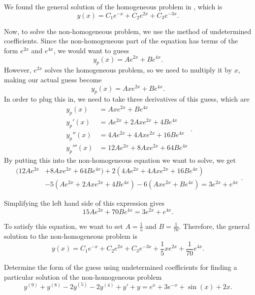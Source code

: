 \begin{exampleSol}
We found the general solution of the homogeneous problem in , which is 
\[ y(x) = C_1 e^{-x} + C_2 e^{2x}+ C_3e^{-3x}. \]

Now, to solve the non-homogeneous problem, we use the method of undetermined coefficients. Since the non-homogeneous part of the equation has terms of the form $e^{2x}$ and $e^{4x}$, we would want to guess 
\[ y_p(x) = Ae^{2x} + Be^{4x}.\] However, $e^{2x}$ solves the homogeneous problem, so we need to multiply it by $x$, making our actual guess become 
\[ y_p(x) = Axe^{2x} + Be^{4x}.\] In order to plug this in, we need to take three derivatives of this guess, which are
\[ 
\begin{split}
y_p(x) &= Axe^{2x} + Be^{4x} \\
y_p'(x) &= Ae^{2x} + 2Axe^{2x} + 4Be^{4x} \\
y_p''(x) &= 4Ae^{2x} + 4Axe^{2x} + 16Be^{4x} \\
y_p'''(x) &= 12Ae^{2x} + 8Axe^{2x} + 64Be^{4x}
\end{split}.
\]
By putting this into the non-homogeneous equation we want to solve, we get
\[
\begin{split}
(12Ae^{2x} &+ 8Axe^{2x} + 64Be^{4x}) + 2(4Ae^{2x} + 4Axe^{2x} + 16Be^{4x})\\
 & - 5(Ae^{2x} + 2Axe^{2x} + 4Be^{4x}) - 6(Axe^{2x} + Be^{4x} ) = 3e^{2x} + e^{4x}
\end{split}.
\]

Simplifying the left hand side of this expression gives
\[ 15Ae^{2x} + 70Be^{4x} = 3e^{2x} + e^{4x}. \]

To satisfy this equation, we want to set $A = \frac{1}{5}$ and $B = \frac{1}{70}$. Therefore, the general solution to the non-homogeneous problem is
\[ y(x) = C_1 e^{-x} + C_2 e^{2x}+ C_3e^{-3x} + \frac{1}{5}xe^{2x} + \frac{1}{70}e^{4x}. \]
\end{exampleSol}

\begin{example}
Determine the form of the guess using undetermined coefficients for finding a particular solution of the non-homogeneous problem
\[ y^{(9)} + y^{(8)} - 2y^{(5)} - 2y^{(4)} + y' + y = e^{x} + 3e^{-x} + \sin(x) + 2x. \]
\end{example}

